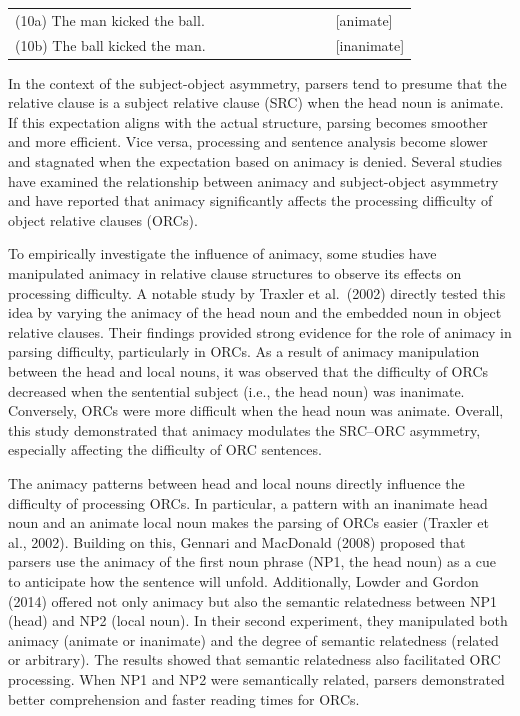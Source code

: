\documentclass[
]{article}
\begin{document}
\vspace{1em}

\noindent
\begin{tabular}{@{}p{0.8\linewidth} p{2.5cm}@{}}
(10a) The man kicked the ball. & \hfill [animate] \\
(10b) The ball kicked the man. & \hfill [inanimate] \\
\end{tabular}

\vspace{1em}

In the context of the subject-object asymmetry, parsers tend to presume
that the relative clause is a subject relative clause (SRC) when the
head noun is animate. If this expectation aligns with the actual
structure, parsing becomes smoother and more efficient. Vice versa,
processing and sentence analysis become slower and stagnated when the
expectation based on animacy is denied. Several studies have examined
the relationship between animacy and subject-object asymmetry and have
reported that animacy significantly affects the processing difficulty of
object relative clauses (ORCs).

To empirically investigate the influence of animacy, some studies have
manipulated animacy in relative clause structures to observe its effects
on processing difficulty. A notable study by Traxler et al.~(2002)
directly tested this idea by varying the animacy of the head noun and
the embedded noun in object relative clauses. Their findings provided
strong evidence for the role of animacy in parsing difficulty,
particularly in ORCs. As a result of animacy manipulation between the
head and local nouns, it was observed that the difficulty of ORCs
decreased when the sentential subject (i.e., the head noun) was
inanimate. Conversely, ORCs were more difficult when the head noun was
animate. Overall, this study demonstrated that animacy modulates the
SRC--ORC asymmetry, especially affecting the difficulty of ORC
sentences.

The animacy patterns between head and local nouns directly influence the
difficulty of processing ORCs. In particular, a pattern with an
inanimate head noun and an animate local noun makes the parsing of ORCs
easier (Traxler et al., 2002). Building on this, Gennari and MacDonald
(2008) proposed that parsers use the animacy of the first noun phrase
(NP1, the head noun) as a cue to anticipate how the sentence will
unfold. Additionally, Lowder and Gordon (2014) offered not only animacy
but also the semantic relatedness between NP1 (head) and NP2 (local
noun). In their second experiment, they manipulated both animacy
(animate or inanimate) and the degree of semantic relatedness (related
or arbitrary). The results showed that semantic relatedness also
facilitated ORC processing. When NP1 and NP2 were semantically related,
parsers demonstrated better comprehension and faster reading times for
ORCs.
\end{document}
